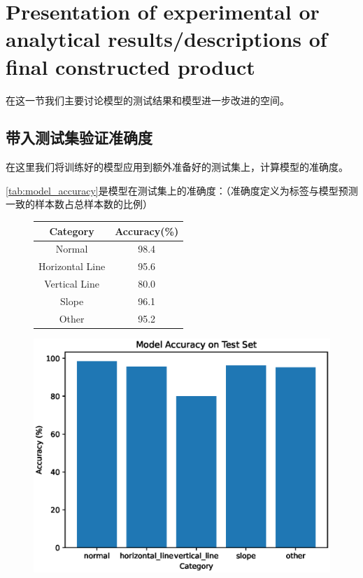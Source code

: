 \section{Presentation of experimental or analytical results/descriptions of final constructed product}
在这一节我们主要讨论模型的测试结果和模型进一步改进的空间。


\subsection{带入测试集验证准确度}

在这里我们将训练好的模型应用到额外准备好的测试集上，计算模型的准确度。

\autoref{tab:model_accuracy}是模型在测试集上的准确度：（准确度定义为标签与模型预测一致的样本数占总样本数的比例）

\begin{figure}[htbp]
    \centering
    \begin{minipage}{0.45\textwidth}
        \centering
        \begin{tabular}{cc}
            \toprule
            Category & Accuracy(\%) \\
            \midrule
            Normal & 98.4 \\
            Horizontal Line & 95.6 \\
            Vertical Line & 80.0 \\
            Slope & 96.1 \\
            Other & 95.2 \\
            \bottomrule
        \end{tabular}
        \label{tab:model_accuracy}
    \end{minipage}
    \begin{minipage}{0.45\textwidth}
        \centering
        \includegraphics[width=\textwidth]{./fig/assistplot/accuracy.eps}
        \label{fig:accuracy_histogram}
    \end{minipage}
\end{figure}


